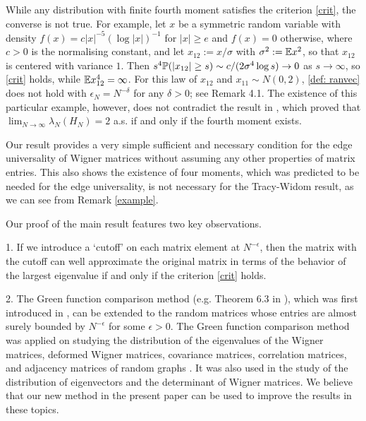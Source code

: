 \begin{rem} \label{example}
While any distribution with finite fourth moment satisfies the criterion \eqref{crit}, the converse is not true. For example, let $x$ be a symmetric random variable with density $f(x)=c|x|^{-5}(\log|x|)^{-1}$ for $|x|\ge e$ and $f(x)=0$ otherwise, where $c>0$ is the normalising constant, and let $x_{12}:=x/\sigma$ with $\sigma^2:=\mathbb{E} x^2$, so that $x_{12}$ is centered with variance $1$. Then $s^4\mathbb{P}(|x_{12}|\ge s)\sim c/(2\sigma^4\log s)\to0$ as $s\to\infty$, so \eqref{crit} holds, while $\mathbb{E} x_{12}^4=\infty$. For this law of $x_{12}$ and $x_{11}\sim N(0,2)$, \eqref{def: ranvec} does not hold with $\epsilon_N=N^{-\delta}$ for any $\delta>0$; see Remark 4.1. The existence of this particular example, however, does not contradict the result in \cite{BY}, which proved that $\lim_{N \to \infty} \lambda_N(H_N) =2$ a.s. if and only if the fourth moment exists.
\end{rem}

Our result provides a very simple sufficient and necessary condition for the edge universality of Wigner matrices without assuming any other  properties of matrix entries. This also shows the existence of four moments, which was predicted to be needed for the edge universality, is not necessary for the Tracy-Widom result, as we can see from Remark \ref{example}.

Our proof of the main result features two key observations.

1. If we introduce a `cutoff' on each matrix element at $N^{-\epsilon}$, then the matrix with the cutoff can well approximate the original matrix in terms of the behavior of the largest eigenvalue if and only if the criterion \eqref{crit} holds.

2. The Green function comparison method (e.g. Theorem 6.3 in \cite{EYY}), which was first introduced in \cite{EYY1}, can be extended to the random matrices whose entries are almost surely bounded by $N^{-\epsilon}$ for some $\epsilon > 0$. The Green function comparison method was applied on studying the distribution of the eigenvalues of the Wigner matrices, deformed Wigner matrices, covariance matrices, correlation matrices, and adjacency matrices of random graphs \cite{EYY1, EYY2, EYY, KY, PY1, PY2, EKYY1, EKYY2}. It was also used in the study of the distribution of eigenvectors \cite {KY0} and the determinant \cite{TV3} of Wigner matrices. We believe that our new method in the present paper can be used to improve the results in these topics.


